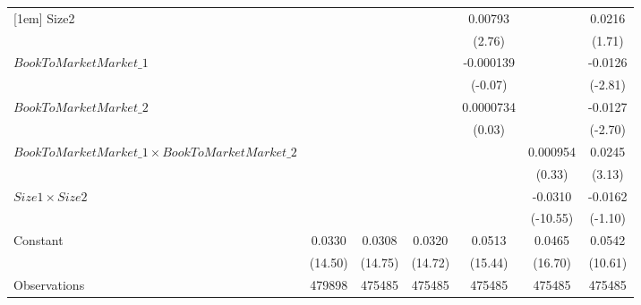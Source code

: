 {\begin{tabular}{l*{6}{c}}
[1em]
Size2               &                     &                     &                     &     0.00793\sym{**} &                     &      0.0216         \\
                    &                     &                     &                     &      (2.76)         &                     &      (1.71)         \\
[1em]
$ BookToMarketMarket\_1 $&                     &                     &                     &   -0.000139         &                     &     -0.0126\sym{**} \\
                    &                     &                     &                     &     (-0.07)         &                     &     (-2.81)         \\
[1em]
$ BookToMarketMarket\_2 $&                     &                     &                     &   0.0000734         &                     &     -0.0127\sym{**} \\
                    &                     &                     &                     &      (0.03)         &                     &     (-2.70)         \\
[1em]
$ BookToMarketMarket\_1 \times BookToMarketMarket\_2 $&                     &                     &                     &                     &    0.000954         &      0.0245\sym{**} \\
                    &                     &                     &                     &                     &      (0.33)         &      (3.13)         \\
[1em]
$ Size1 \times Size2 $&                     &                     &                     &                     &     -0.0310\sym{***}&     -0.0162         \\
                    &                     &                     &                     &                     &    (-10.55)         &     (-1.10)         \\
[1em]
Constant            &      0.0330\sym{***}&      0.0308\sym{***}&      0.0320\sym{***}&      0.0513\sym{***}&      0.0465\sym{***}&      0.0542\sym{***}\\
                    &     (14.50)         &     (14.75)         &     (14.72)         &     (15.44)         &     (16.70)         &     (10.61)         \\
\hline
Observations        &      479898         &      475485         &      475485         &      475485         &      475485         &      475485         \\

\end{tabular}}
